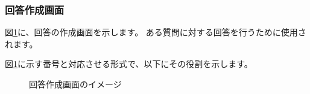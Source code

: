 \documentclass[a4j]{jarticle}
\begin{document}
\newpage
\subsubsection{回答作成画面}
図\ref{honjo_CR_CreateAnswer}に、回答の作成画面を示します。
ある質問に対する回答を行うために使用されます。

図\ref{honjo_CR_CreateAnswer}に示す番号と対応させる形式で、以下にその役割を示します。

\begin{figure}[H]
    \begin{center}
    \caption {回答作成画面のイメージ}
    \label{honjo_CR_CreateAnswer}
    \end{center}
\end{figure}
\end{document}
